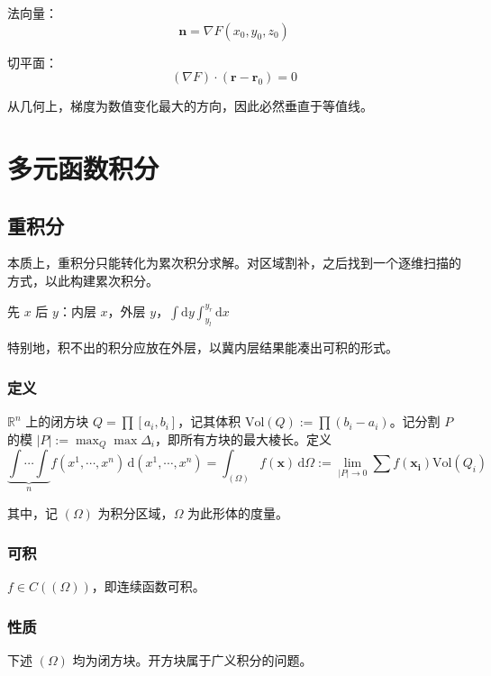 \documentclass[12pt, a4paper, UTF8, openany]{ctexbook}
\newcommand{\dif}{\mathrm{d}}
\newcommand{\sdif}{\,\dif}
\newcommand{\field}[1]{\mathbb{#1}}%
\newcommand{\mat}[1]{\mathbf{#1}}
\begin{document}
        法向量：
        $$\mat{n} = \nabla F (x_0, y_0, z_0)$$

        切平面：
        $$(\nabla F) \cdot (\mat{r} - \mat{r}_0) = 0$$

        从几何上，梯度为数值变化最大的方向，因此必然垂直于等值线。
    
    \chapter{多元函数积分}
    \section{重积分}
        本质上，重积分只能转化为累次积分求解。对区域割补，之后找到一个逐维扫描的方式，以此构建累次积分。

        先 $x$ 后 $y$：内层 $x$，外层 $y$，$\int \dif y \int_{y_l}^{y_r} \dif x$

        特别地，积不出的积分应放在外层，以冀内层结果能凑出可积的形式。

        \subsection{定义}
        $\field{R}^n$ 上的闭方块 $Q = \prod [a_i, b_i]$，记其体积 $\text{Vol}(Q) := \prod (b_i - a_i)$。记分割 $P$ 的模 $|P| := \max_{Q} \max \Delta_i$，即所有方块的最大棱长。定义
        $$\underbrace{\int \cdots \int}_{n} f(x^1, \cdots, x^n) \sdif (x^1, \cdots, x^n) = \int_{(\Omega)} f(\mat{x}) \sdif \Omega := \lim_{|P| \to 0} \sum f(\mat{x_i}) \text{Vol}(Q_i)$$

        其中，记 $(\Omega)$ 为积分区域，$\Omega$ 为此形体的度量。

        \subsection{可积}
        $f \in C\left( (\Omega) \right)$，即连续函数可积。

        \subsection{性质}
        下述 $(\Omega)$ 均为闭方块。开方块属于广义积分的问题。
\end{document}
